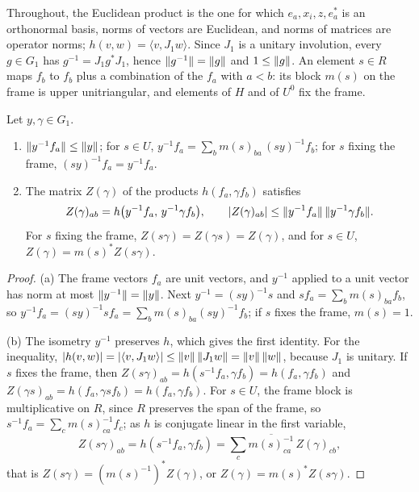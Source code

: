 Throughout, the Euclidean product is the one for which $e_a,x_i,z,e^*_a$ is an orthonormal basis, norms of vectors are Euclidean, and norms of matrices are
operator norms; $h(v,w)=\langle v,J_1w\rangle$. Since $J_1$ is a unitary involution, every $g\in G_1$ has $g^{-1}=J_1g^*J_1$, hence $\lVert g^{-1}\rVert=\lVert g\rVert$ and
$1\le\lVert g\rVert$. An element $s\in R$ maps $f_b$ to $f_b$ plus a combination of the $f_a$ with $a<b$: its block $m(s)$ on the frame is upper unitriangular,
and elements of $H$ and of $U^0$ fix the frame.

\begin{lemma}\label{lem:frame-vectors}
Let $y,\gamma\in G_1$.
\begin{enumerate}[label=\textup{(\alph*)}]
\item $\lVert y^{-1}f_a\rVert\le\lVert y\rVert$; for $s\in U$, $y^{-1}f_a=\sum_bm(s)_{ba}\,(sy)^{-1}f_b$; for $s$ fixing the frame, $(sy)^{-1}f_a=y^{-1}f_a$.
\item The matrix $Z(\gamma)$ of the products $h(f_a,\gamma f_b)$ satisfies
\[
  Z(\gamma)_{ab}=h\bigl(y^{-1}f_a,\,y^{-1}\gamma f_b\bigr),\qquad\lvert Z(\gamma)_{ab}\rvert\le\lVert y^{-1}f_a\rVert\,\lVert y^{-1}\gamma f_b\rVert.
\] For $s$ fixing the frame,
$Z(s\gamma)=Z(\gamma s)=Z(\gamma)$, and for $s\in U$, $Z(\gamma)=m(s)^*Z(s\gamma)$.
\end{enumerate}
\end{lemma}

\begin{proof}
(a) The frame vectors $f_a$ are unit vectors, and $y^{-1}$ applied to a unit vector has norm at most $\lVert y^{-1}\rVert=\lVert y\rVert$. Next $y^{-1}=(sy)^{-1}s$ and $sf_a=\sum_bm(s)_{ba}f_b$, so
$y^{-1}f_a=(sy)^{-1}sf_a=\sum_bm(s)_{ba}(sy)^{-1}f_b$; if $s$ fixes the frame, $m(s)=1$.

(b) The isometry $y^{-1}$ preserves $h$, which gives the first identity. For the inequality, $\lvert h(v,w)\rvert=\lvert \langle v,J_1w\rangle\rvert\le\lVert v\rVert\,\lVert J_1w\rVert=\lVert v\rVert\,\lVert w\rVert$, because $J_1$ is unitary. If $s$ fixes the frame, then
$Z(s\gamma)_{ab}=h(s^{-1}f_a,\gamma f_b)=h(f_a,\gamma f_b)$ and $Z(\gamma s)_{ab}=h(f_a,\gamma sf_b)=h(f_a,\gamma f_b)$. For $s\in U$, the frame block is multiplicative on $R$, since $R$ preserves the span of the frame, so
$s^{-1}f_a=\sum_cm(s)^{-1}_{ca}f_c$; as $h$ is conjugate linear in the first variable,
\[
  Z(s\gamma)_{ab}=h(s^{-1}f_a,\gamma f_b)=\sum_c\overline{m(s)^{-1}_{ca}}\,Z(\gamma)_{cb},
\]
that is $Z(s\gamma)=(m(s)^{-1})^*Z(\gamma)$, or $Z(\gamma)=m(s)^*Z(s\gamma)$.
\end{proof}

